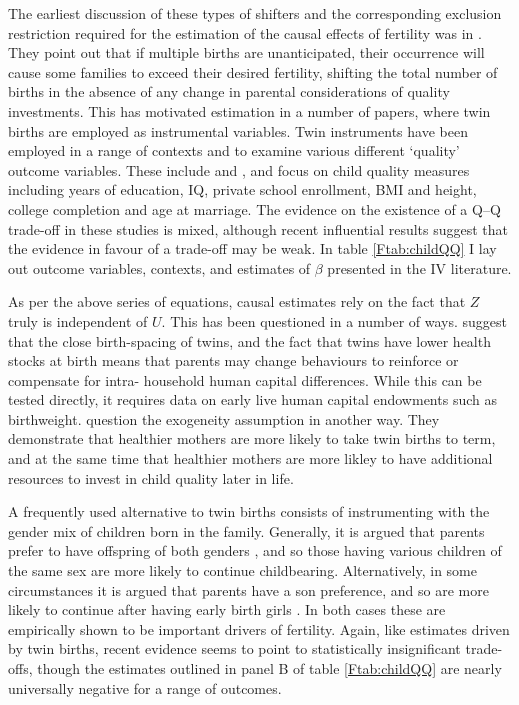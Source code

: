 The earliest discussion of these types of shifters and the corresponding 
exclusion restriction required for the estimation of the causal effects of 
fertility was in \citet{RosenzweigWolpin1980}. They point out that if multiple 
births are unanticipated, their occurrence will cause some families to exceed 
their desired fertility, shifting the total number of births in the absence of 
any change in parental considerations of quality investments. This has motivated 
estimation in a number of papers, where twin births are employed as instrumental 
variables.  Twin instruments have been employed in a range of contexts and
to examine various different `quality' outcome variables.  These include
\citet{Blacketal2005,Caceres2006,Lietal2008,Dayiogluetal2009,Sanhueza2009,
Blacketal2010,Angristetal2010,FitzsimonsMalde2010} and \citet{SouzaPonczek2012}, 
and focus on child quality measures including years of education, IQ, private 
school enrollment, BMI and height, college completion and age at marriage.  The 
evidence on the existence of a Q--Q trade-off in these studies is mixed, 
although recent influential results suggest that the evidence in favour of a 
trade-off may be weak.  In table \ref{Ftab:childQQ} I lay out outcome variables, 
contexts, and estimates of $\beta$ presented in the IV literature.

As per the above series of equations, causal estimates rely on the fact that
$Z$ truly is independent of $U$.  This has been questioned in a number of ways.
\citet{RosenzweigZhang2009} suggest that the close birth-spacing of twins, and 
the fact that twins have lower health stocks at birth \citep{Almondetal2005}
means that parents may change behaviours to reinforce or compensate for intra-%
household human capital differences.  While this can be tested directly, it 
requires data on early live human capital endowments such as birthweight.  
\citet{BhalotraClarke2015} question the exogeneity assumption in another way.
They demonstrate that healthier mothers are more likely to take twin births
to term, and at the same time that healthier mothers are more likley to have
additional resources to invest in child quality later in life. 

A frequently used alternative to twin births consists of instrumenting with the 
gender mix of children born in the family. Generally, it is argued that parents
prefer to have offspring of both genders \citep{ConleyGlauber2006,Angristetal2010,
Beckeretal2010,MillimetWang2011,FitzsimonsMalde2014}, and so those having various 
children of the same sex are more likely to continue childbearing. Alternatively, 
in some circumstances it is argued that parents have a son preference, and so are 
more likely to continue after having early birth girls \citep{Lee2008,
KumarKugler2011}. In both cases these are empirically shown to be important 
drivers of fertility.  Again, like estimates driven by twin births, recent 
evidence seems to point to statistically insignificant trade-offs, though the 
estimates outlined in panel B of table \ref{Ftab:childQQ} are nearly universally 
negative for a range of outcomes.

